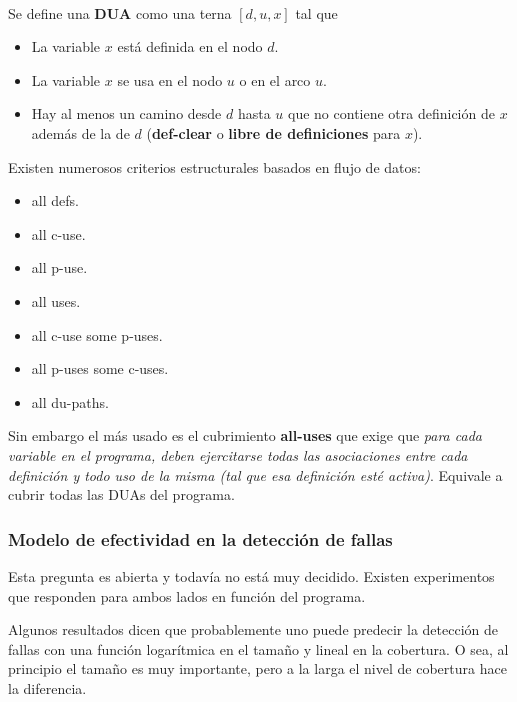 \documentclass[]{article}
\begin{document}
~\newline

Se define una \textbf{DUA} como una terna $[d, u, x]$ tal que
\begin{itemize}
	\item La variable $x$ está definida en el nodo $d$.
	\item La variable $x$ se usa en el nodo $u$ o en el arco $u$.
	\item Hay al menos un camino desde $d$ hasta $u$ que no contiene otra definición de $x$ además de la de $d$ (\textbf{def-clear} o \textbf{libre de definiciones} para $x$).
\end{itemize}

Existen numerosos criterios estructurales basados en flujo de datos:
\begin{multicols}{2}
	\begin{itemize}
		\item all defs.
	 	\item all c-use.
 		\item all p-use.
		\item all uses.
		\item all c-use some p-uses.
		\item all p-uses some c-uses.
		\item all du-paths.
	\end{itemize}
\end{multicols}

Sin embargo el más usado es el cubrimiento \textbf{all-uses} que exige que \textit{para cada variable en el programa, deben ejercitarse todas las asociaciones entre cada definición y todo uso de la misma (tal que esa definición esté activa)}. Equivale a cubrir todas las DUAs del programa.

\begin{center}
\end{center}

\subsubsection{Modelo de efectividad en la detección de fallas}

Esta pregunta es abierta y todavía no está muy decidido. Existen experimentos que responden para ambos lados en función del programa.


Algunos resultados dicen que probablemente uno puede predecir la detección de fallas con una función logarítmica en el tamaño y lineal en la cobertura.
O sea, al principio el tamaño es muy importante, pero a la larga el nivel de cobertura hace la diferencia.
\end{document}
